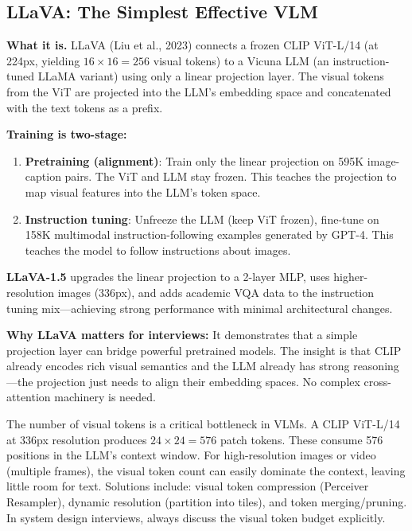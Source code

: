 \subsection{LLaVA: The Simplest Effective VLM}

\textbf{What it is.} LLaVA (Liu et al., 2023) connects a frozen CLIP ViT-L/14 (at 224px, yielding $16 \times 16 = 256$ visual tokens) to a Vicuna LLM (an instruction-tuned LLaMA variant) using only a linear projection layer. The visual tokens from the ViT are projected into the LLM's embedding space and concatenated with the text tokens as a prefix.

\textbf{Training is two-stage:}
\begin{enumerate}
    \item \textbf{Pretraining (alignment)}: Train only the linear projection on 595K image-caption pairs. The ViT and LLM stay frozen. This teaches the projection to map visual features into the LLM's token space.
    \item \textbf{Instruction tuning}: Unfreeze the LLM (keep ViT frozen), fine-tune on 158K multimodal instruction-following examples generated by GPT-4. This teaches the model to follow instructions about images.
\end{enumerate}

\textbf{LLaVA-1.5} upgrades the linear projection to a 2-layer MLP, uses higher-resolution images (336px), and adds academic VQA data to the instruction tuning mix---achieving strong performance with minimal architectural changes.

\textbf{Why LLaVA matters for interviews:} It demonstrates that a simple projection layer can bridge powerful pretrained models. The insight is that CLIP already encodes rich visual semantics and the LLM already has strong reasoning---the projection just needs to align their embedding spaces. No complex cross-attention machinery is needed.

\begin{warningbox}
The number of visual tokens is a critical bottleneck in VLMs. A CLIP ViT-L/14 at 336px resolution produces $24 \times 24 = 576$ patch tokens. These consume 576 positions in the LLM's context window. For high-resolution images or video (multiple frames), the visual token count can easily dominate the context, leaving little room for text. Solutions include: visual token compression (Perceiver Resampler), dynamic resolution (partition into tiles), and token merging/pruning. In system design interviews, always discuss the visual token budget explicitly.
\end{warningbox}

